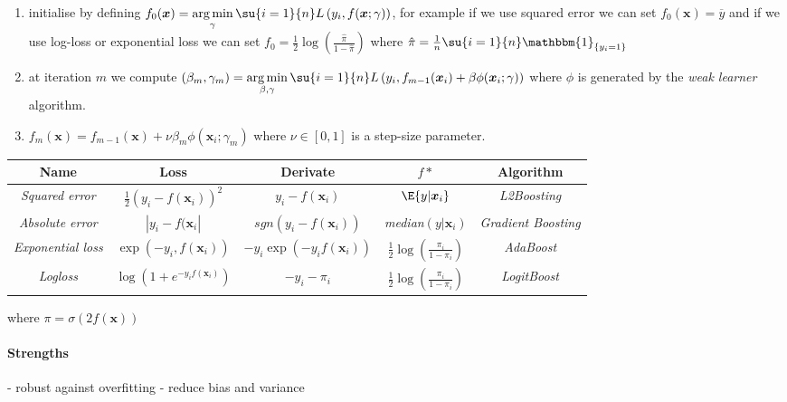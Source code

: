 \begin{enumerate}
    \item initialise by defining $f_{0}(\bm{x}) = \displaystyle\argmin_{\gamma}\su{i=1}{n}L\left(
        y_{i},f(\bm{x};\gamma)\right)$, for example if we use squared error we can
        set $f_{0}(\bm{x})=\overline{y}$ and if we use log-loss or exponential loss we can set       
        $f_{0}=\frac{1}{2}\log\left(\frac{\hat{\pi}}{1-\hat{\pi}}\right)$ where $\hat{\pi} = 
        \frac{1}{n}\su{i=1}{n}\mathbbm{1}_{\{y_{i}=1\}}$
    \item at iteration $m$ we compute $(\beta_{m},\gamma_{m}) = \displaystyle\argmin_{\beta,\gamma}
        \su{i=1}{n}L\left(y_{i},f_{m-1}(\bm{x}_{i})+\beta\phi(\bm{x}_{i};\gamma) 
        \right)$ where $\phi$ is generated by the \emph{weak learner} algorithm.
    \item $f_{m}(\bm{x}) = f_{m-1}(\bm{x}) + \nu\beta_{m}\phi(\bm{x}_{i};\gamma_{m})$ where $\nu\in
        [0,1]$ is a step-size parameter.
\end{enumerate}

\begin{center}
    \begin{tabular}{|*{5}{c|}}
    \hline
    \textbf{Name} & \textbf{Loss}& \textbf{Derivate}& \textbf{$f{*}$} & \textbf{Algorithm}\\
    \hline
    \emph{Squared error} & $\frac{1}{2}\left(y_{i}-f(\bm{x}_{i})\right)^{2}$ & 
    $y_{i}-f(\bm{x}_{i})$ & $\E{y|\bm{x}_{i}}$ & \emph{L2Boosting}\\
    \hline
    \emph{Absolute error} & $|y_{i}-f(\bm{x}_{i}|$ & 
    $sgn(y_{i}-f(\bm{x}_{i}))$ & \emph{median}$(y|\bm{x}_{i})$ & \emph{Gradient 
    Boosting}\\
    \hline
    \emph{Exponential loss} & $\exp\left(-y_{i},f(\bm{x}_{i})\right)$ & $-y_{i}\exp(
    -y_{i}f(\bm{x}_{i}))$ & $\frac{1}{2}\log\left(\frac{\pi_{i}}{1 - \pi_{i}}\right)$&
    \emph{AdaBoost}\\
    \hline
    \emph{Logloss} & $\log\left(1+e^{-y_{i}f(\bm{x}_{i})}\right)$ & $-y_{i}-\pi_{i}$ &
    $\frac{1}{2}\log\left(\frac{\pi_{i}}{1 - \pi_{i}}\right)$ & \emph{LogitBoost}\\
    \hline
    \end{tabular}
\end{center}
where $\pi=\sigma\left(2f(\bm{x})\right)$


\paragraph{Strengths}
- robust against overfitting
- reduce bias and variance
